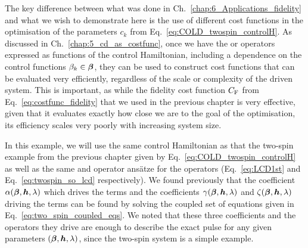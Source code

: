The key difference between what was done in Ch.~\ref{chap:6_Applications_fidelity} and what we wish to demonstrate here is the use of different cost functions in the optimisation of the parameters $c_k$ from Eq.~\eqref{eq:COLD_twospin_controlH}. As discussed in Ch.~\ref{chap:5_cd_as_costfunc}, once we have the  or  operators expressed as functions of the control Hamiltonian, including a dependence on the control functions $\beta_k \in \boldsymbol{\beta}$, they can be used to construct cost functions that can be evaluated very efficiently, regardless of the scale or complexity of the driven system. This is important, as while the fidelity cost function $C_{\rm F}$ from Eq.~\eqref{eq:costfunc_fidelity} that we used in the previous chapter is very effective, given that it evaluates exactly how close we are to the goal of the optimisation, its efficiency scales very poorly with increasing system size. 

In this example, we will use the same control Hamiltonian as that the two-spin example from the previous chapter given by Eq.~\eqref{eq:COLD_twospin_controlH} as well as the same  and  operator ans\"{a}tze for the  operators (Eq.~\eqref{eq:LCD1st} and Eq.~\eqref{eq:twospin_so_lcd} respectively). We found previously that the coefficient $\alpha(\boldsymbol{\beta}, \boldsymbol{h}, \lambda)$ which drives the   terms and the coefficients $\gamma(\boldsymbol{\beta}, \boldsymbol{h}, \lambda)$ and $\zeta(\boldsymbol{\beta}, \boldsymbol{h}, \lambda)$ driving the   terms can be found by solving the coupled set of equations given in Eq.~\eqref{eq:two_spin_coupled_eqs}. We noted that these three coefficients and the operators they drive are enough to describe the exact  pulse for any given parameters $(\boldsymbol{\beta}, \boldsymbol{h}, \lambda)$, since the two-spin system is a simple example.

